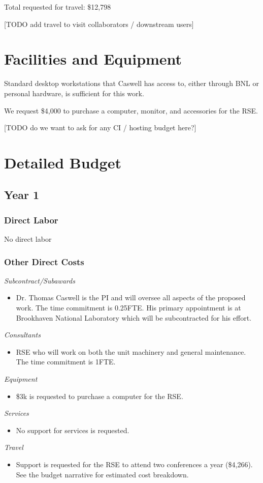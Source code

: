 \documentclass[12pt]{article}
\numberwithin{page}{section}
\begin{document}
Total requested for travel: \$12,798

[TODO add travel to visit collaborators / downstream users]

\newpage
\section{Facilities and Equipment}
\setcounter{page}{1}

Standard desktop workstations that Caswell has access to, either
through BNL or personal hardware, is sufficient for this work.

We request \$4,000 to purchase a computer, monitor, and accessories
for the RSE.


[TODO do we want to ask for any CI / hosting budget here?]



\newpage
\section{Detailed Budget}
\setcounter{page}{1}
\subsection{Year 1}
\subsubsection{Direct Labor}
No direct labor
\subsubsection{Other Direct Costs}
\textit{Subcontract/Subawards}
\begin{itemize}
\item Dr. Thomas Caswell is the PI and will oversee all aspects of the
  proposed work.  The time commitment is 0.25FTE.  His primary
  appointment is at Brookhaven National Laboratory which will be
  subcontracted for his effort.
\end{itemize}
\textit{Consultants}
\begin{itemize}
\item RSE who will work on both the unit machinery and general
  maintenance.  The time commitment is 1FTE.
\end{itemize}
\textit{Equipment}
\begin{itemize}
\item \$3k is requested to purchase a computer for the RSE.
\end{itemize}
\textit{Services}
\begin{itemize}
\item No support for services is requested.
\end{itemize}
\textit{Travel}
\begin{itemize}
\item Support is requested for the RSE to attend two conferences a
  year (\$4,266).  See the budget narrative for estimated cost
  breakdown.
\end{itemize}
\end{document}
